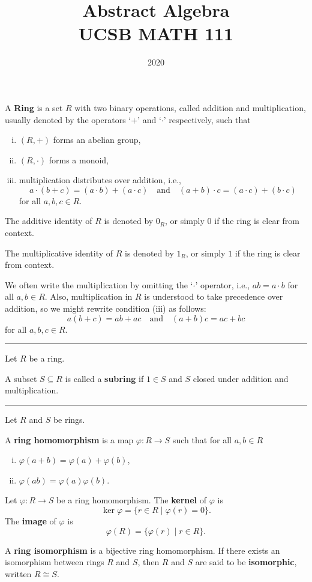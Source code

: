 \documentclass[12pt]{article}
\title{Abstract Algebra\\
    \large UCSB MATH 111
}
\author{}
\date{2020\textendash 2021}
\newcommand{\keyword}[1]{\textbf{#1}}
\newcommand{\sepline}{\rule{\textwidth}{0.4pt}}
\theoremstyle{definition}
\newcommand{\isp}[1]{\quad\text{#1}\quad}
\renewcommand{\phi}{\varphi}
\newcommand{\<}{\left\langle}
\renewcommand{\>}{\right\rangle}
\newcommand{\isom}{\cong}
\newcommand{\seq}{\subseteq}
\begin{document}
A \keyword{Ring} is a set $R$ with two binary operations, called addition and multiplication, usually denoted by the operators `$+$' and `$\cdot$' respectively, such that
\begin{enumerate}[(i)]
    \item $(R, +)$ forms an abelian group,
    \item $(R, \cdot)$ forms a monoid,
    \item multiplication distributes over addition, i.e., 
    \[
        a \cdot (b + c) = (a \cdot b) + (a \cdot c)
        \isp{and}
        (a + b) \cdot c = (a \cdot c) + (b \cdot c)
    \]
    for all $a, b, c \in R$.
\end{enumerate}

The additive identity of $R$ is denoted by $0_R$, or simply $0$ if the ring is clear from context.

The multiplicative identity of $R$ is denoted by $1_R$, or simply $1$ if the ring is clear from context.

We often write the multiplication by omitting the `$\cdot$' operator, i.e., $ab = a \cdot b$ for all $a, b \in R$.
Also, multiplication in $R$ is understood to take precedence over addition, so we might rewrite condition (iii) as follows:
\[
    a(b + c) = ab + ac \isp{and} (a + b)c = ac + bc
\]
for all $a, b, c \in R$.

\sepline

Let $R$ be a ring.

A subset $S \seq R$ is called a \keyword{subring} if $1 \in S$ and $S$ closed under addition and multiplication.

\sepline

Let $R$ and $S$ be rings.

A \keyword{ring homomorphism} is a map $\phi : R \to S$ such that for all $a, b \in R$
    \begin{enumerate}[(i)]
        \item $\phi(a + b) = \phi(a) + \phi(b)$,
        \item $\phi(ab) = \phi(a)\phi(b)$.
    \end{enumerate}
    
Let $\phi : R \to S$ be a ring homomorphism. The \keyword{kernel} of $\phi$ is
\[
    \ker \phi = \{r \in R \mid \phi(r) = 0\}.
\]
The \keyword{image} of $\phi$ is
\[
    \phi(R) = \{\phi(r) \mid r \in R\}.
    \]
    
A \keyword{ring isomorphism} is a bijective ring homomorphism. If there exists an isomorphism between rings $R$ and $S$, then $R$ and $S$ are said to be \keyword{isomorphic}, written $R \isom S$.
\end{document}
